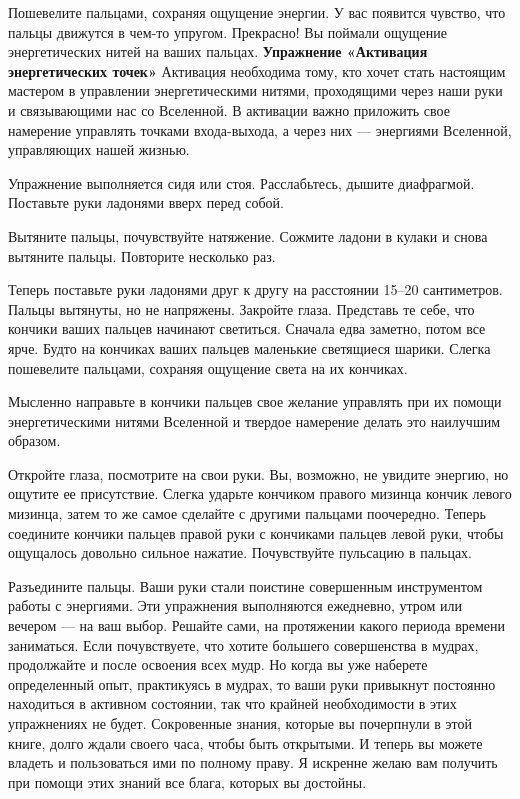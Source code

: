 Пошевелите пальцами, сохраняя ощущение энергии. У вас появится чувство, что пальцы движутся в чем-то упругом. Прекрасно! Вы поймали ощущение энергетических нитей на ваших пальцах.
\bigskip
{\bf Упражнение
«Активация энергетических точек»}
\medskip
Активация необходима тому, кто хочет стать настоящим мастером в управлении энергетическими нитями, проходящими через наши руки и связывающими нас со Вселенной. В активации важно приложить свое намерение управлять точками входа-выхода, а через них --- энергиями Вселенной, управляющих нашей жизнью.

Упражнение выполняется сидя или стоя. Расслабьтесь, дышите диафрагмой. Поставьте руки ладонями вверх перед собой.

Вытяните пальцы, почувствуйте натяжение. Сожмите ладони в кулаки и снова вытяните пальцы. Повторите несколько раз.

Теперь поставьте руки ладонями друг к другу на расстоянии 15--20 сантиметров. Пальцы вытянуты, но не напряжены. Закройте глаза. Представь те себе, что кончики ваших пальцев начинают светиться. Сначала едва заметно, потом все ярче. Будто
на кончиках ваших пальцев маленькие светящиеся шарики. Слегка пошевелите пальцами, сохраняя ощущение света на их кончиках.

Мысленно направьте в кончики пальцев свое желание управлять при их помощи энергетическими нитями Вселенной и твердое намерение делать это наилучшим образом.

Откройте глаза, посмотрите на свои руки. Вы, возможно, не увидите энергию, но ощутите ее
присутствие. Слегка ударьте кончиком правого мизинца кончик левого мизинца, затем то же самое
сделайте с другими пальцами поочередно. Теперь соедините кончики пальцев правой руки с кончиками
пальцев левой руки, чтобы ощущалось довольно сильное нажатие. Почувствуйте пульсацию в пальцах.

Разъедините пальцы. Ваши руки стали поистине совершенным инструментом работы с энергиями.
\bigskip
Эти упражнения выполняются ежедневно, утром или вечером --- на ваш выбор. Решайте сами, на
протяжении какого периода времени заниматься. Если почувствуете, что хотите большего совершенства
в мудрах, продолжайте и после освоения всех мудр. Но когда вы уже наберете определенный опыт,
практикуясь в мудрах, то ваши руки привыкнут постоянно находиться в активном состоянии, так что
крайней необходимости в этих упражнениях не будет.
Сокровенные знания, которые вы почерпнули в этой книге, долго ждали своего часа, чтобы быть
открытыми. И теперь вы можете владеть и пользоваться ими по полному праву. Я искренне желаю вам получить при помощи этих знаний все блага, которых
вы достойны.
\bye
